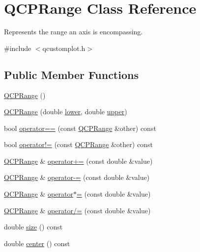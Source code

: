 \hypertarget{class_q_c_p_range}{}\section{Q\+C\+P\+Range Class Reference}
\label{class_q_c_p_range}


Represents the range an axis is encompassing.  




{\ttfamily \#include $<$qcustomplot.\+h$>$}

\subsection*{Public Member Functions}
\begin{DoxyCompactItemize}
\item 
\hyperlink{class_q_c_p_range_aca158d7e69702cee5d77d10a269b01e2}{Q\+C\+P\+Range} ()
\item 
\hyperlink{class_q_c_p_range_a1d9d84d084c8f368fdedd42e0978d405}{Q\+C\+P\+Range} (double \hyperlink{class_q_c_p_range_aa3aca3edb14f7ca0c85d912647b91745}{lower}, double \hyperlink{class_q_c_p_range_ae44eb3aafe1d0e2ed34b499b6d2e074f}{upper})
\item 
bool \hyperlink{class_q_c_p_range_a9f8d1fdcf4b6d19779f1c3d9a14b09c9}{operator==} (const \hyperlink{class_q_c_p_range}{Q\+C\+P\+Range} \&other) const
\item 
bool \hyperlink{class_q_c_p_range_a4827a37c83b8bb4bf53fcf8f6a257e77}{operator!=} (const \hyperlink{class_q_c_p_range}{Q\+C\+P\+Range} \&other) const
\item 
\hyperlink{class_q_c_p_range}{Q\+C\+P\+Range} \& \hyperlink{class_q_c_p_range_afea7c1aa7d08f061cd9bd8832f957df8}{operator+=} (const double \&value)
\item 
\hyperlink{class_q_c_p_range}{Q\+C\+P\+Range} \& \hyperlink{class_q_c_p_range_a95894bcb15a16a75ca564091374e2191}{operator-\/=} (const double \&value)
\item 
\hyperlink{class_q_c_p_range}{Q\+C\+P\+Range} \& \hyperlink{class_q_c_p_range_a6876aa9620ff2f0f7f1873f998372cef}{operator$\ast$=} (const double \&value)
\item 
\hyperlink{class_q_c_p_range}{Q\+C\+P\+Range} \& \hyperlink{class_q_c_p_range_a6137d8682b6835ace840730b4c1e2d63}{operator/=} (const double \&value)
\item 
double \hyperlink{class_q_c_p_range_a62326e7cc4316b96df6a60813230e63f}{size} () const
\item 
double \hyperlink{class_q_c_p_range_af57d4a37a45d0101177ca30fae5d4ca8}{center} () const

\end{DoxyCompactItemize}
